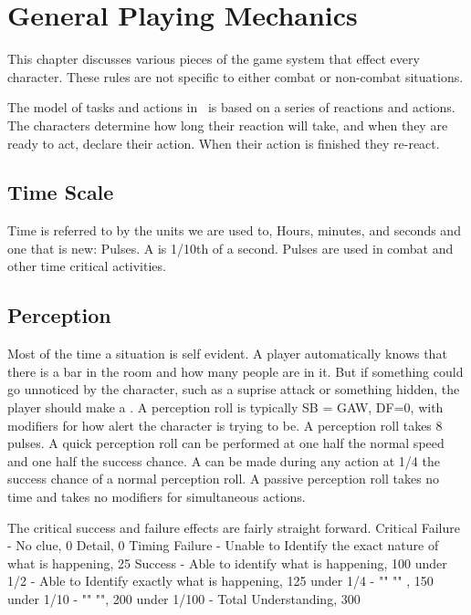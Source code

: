\chapter{General Playing Mechanics}

This chapter discusses various pieces of the game system that 
effect every character. These rules are not specific to either 
combat or non-combat situations. 

The model of tasks and actions in \SH\ is based on a series of reactions and 
actions. The characters determine how long their reaction will take, and  
when they are ready to act, declare their action. When their action is finished 
they re-react. 

\section{Time Scale}

Time is referred to by the units we are used to, Hours, minutes, and seconds 
and one that is new: Pulses. A  is 1/10th of a second. Pulses are
used in combat and other time critical activities.

\section{Perception}

Most of the time a situation is self evident. A player automatically
knows that there is a bar in the room and how many people are in it.
But if something could go unnoticed by the character, such as a suprise 
attack or something hidden, the player should make a . 
A perception roll is typically SB = GAW, DF=0, with modifiers for 
how alert the character is trying to be. A perception roll takes
8 pulses. A quick perception roll can be performed at one half the normal speed
and one half the success chance. A  can be made 
during any action at 1/4 the success chance of a normal perception roll. A
passive perception roll takes no time and takes no modifiers for 
simultaneous actions.

The critical success and failure effects are fairly straight forward.
Critical Failure - No clue, 0 Detail, 0 Timing
Failure - Unable to Identify the exact nature of what is happening, 25%
Success - Able to identify what is happening, 100%
under 1/2 - Able to Identify exactly what is happening, 125%
under 1/4 - "" "" , 150%
under 1/10 - "" "", 200%
under 1/100 - Total Understanding, 300%


